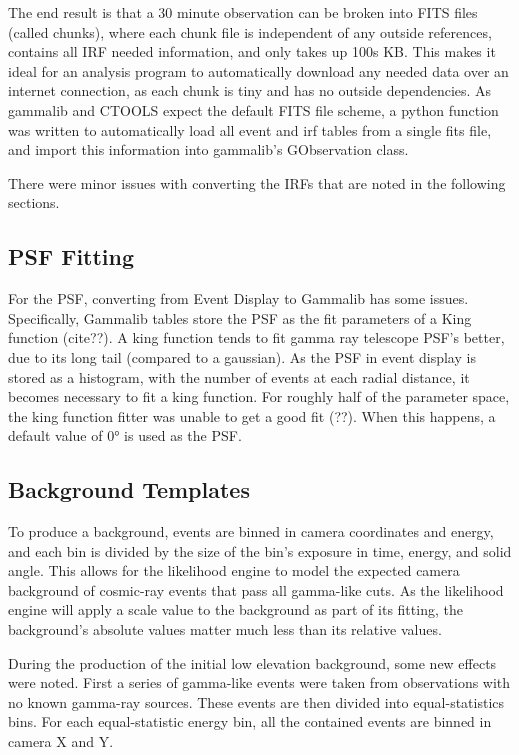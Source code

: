 The end result is that a 30 minute observation can be broken into  FITS files (called chunks), where each chunk file is independent of any outside references, contains all IRF needed information, and only takes up \nicetilde100s KB.
This makes it ideal for an analysis program to automatically download any needed data over an internet connection, as each chunk is tiny and has no outside dependencies.
As gammalib and CTOOLS expect the default FITS file scheme, a python function was written to automatically load all event and irf tables from a single fits file, and import this information into gammalib's GObservation class.

There were minor issues with converting the IRFs that are noted in the following sections.

\subsection{PSF Fitting}

For the PSF, converting from Event Display to Gammalib has some issues.
Specifically, Gammalib tables store the PSF as the fit parameters of a King function (cite??).
A king function tends to fit gamma ray telescope PSF's better, due to its long tail (compared to a gaussian).
As the PSF in event display is stored as a histogram, with the number of events at each radial distance, it becomes necessary to fit a king function.
For roughly half of the parameter space, the king function fitter was unable to get a good fit (??).
When this happens, a default value of $\ang{0}$ is used as the PSF.


\subsection{Background Templates}

To produce a background, events are binned in camera coordinates and energy, and each bin is divided by the size of the bin's exposure in time, energy, and solid angle.
This allows for the likelihood engine to model the expected camera background of cosmic-ray events that pass all gamma-like cuts.
As the likelihood engine will apply a scale value to the background as part of its fitting, the background's absolute values matter much less than its relative values.

During the production of the initial low elevation background, some new effects were noted.
First a series of gamma-like events were taken from observations with no known gamma-ray sources.
These events are then divided into equal-statistics bins.
For each equal-statistic energy bin, all the contained events are binned in camera X and Y.

